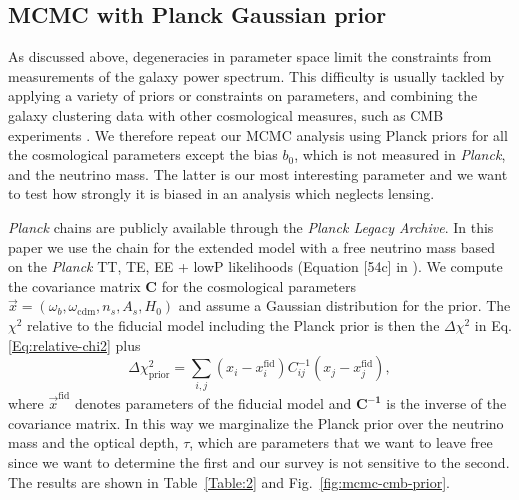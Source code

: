 \subsection{MCMC with Planck Gaussian prior}

As discussed above, degeneracies in parameter space limit the constraints from measurements of the galaxy power spectrum. This difficulty is usually tackled by applying a variety of priors or constraints on parameters, and combining the galaxy clustering data with other cosmological measures, such as CMB experiments \cite{Tegmark:2003ud}. We therefore
repeat our MCMC analysis using Planck priors for all the cosmological parameters except the bias $b_0$, which is not measured in {\it Planck}, and the neutrino mass. The latter is our most interesting parameter and we want to test how strongly it is biased in an analysis which neglects lensing.

{\it Planck} chains are publicly available through the \textit{Planck Legacy Archive}. In this paper we use the chain for the extended model with a free neutrino mass based on the {\it Planck} TT, TE, EE + lowP likelihoods (Equation [54c] in \cite{Ade:2015xua}). We compute the covariance matrix $\mathbf{C}$ for the cosmological parameters $\vec{x}=(\omega_b,\omega_{\mathrm{cdm}},n_s,A_s,H_0)$ and assume a Gaussian distribution for the prior. The $\chi^2$ relative to the fiducial model including the Planck prior is then the $\Delta \chi^2$ in Eq. \eqref{Eq:relative-chi2} plus
\begin{equation}
\Delta \chi^2_{\mathrm{prior}} = \sum_{i,j} (x_i - x^{\mathrm{fid}}_i) C^{-1}_{ij} (x_j - x^{\mathrm{fid}}_j),
\label{Eq:chi2-prior}
\end{equation}
where $\vec{x}^{\mathrm{fid}}$ denotes parameters of the fiducial model and $\mathbf{C^{-1}}$ is the inverse of the covariance matrix. In this way we marginalize the Planck prior over the neutrino mass and the optical depth, $\tau$, which are parameters that we want to leave free since we want to determine the first and our survey is not sensitive to the second. The results are shown in Table~\ref{Table:2} and Fig.~\ref{fig:mcmc-cmb-prior}.

